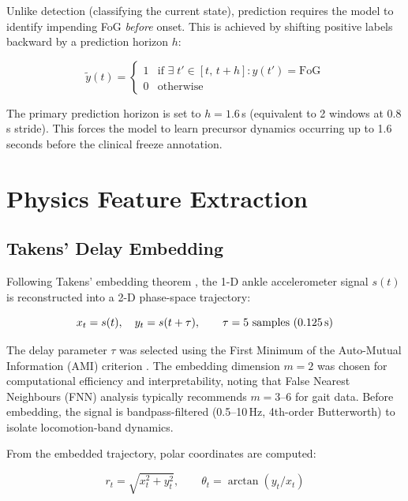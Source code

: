 \documentclass[12pt,a4paper,oneside]{report}
\numberwithin{equation}{chapter}
\numberwithin{figure}{chapter}
\numberwithin{table}{chapter}
\begin{document}
Unlike detection (classifying the current state), prediction requires the model to identify impending FoG \textit{before} onset. This is achieved by shifting positive labels backward by a prediction horizon $h$:

\begin{equation}
  \tilde{y}(t) =
  \begin{cases}
    1 & \text{if } \exists\; t' \in [t,\, t+h]: y(t')=\text{FoG} \\
    0 & \text{otherwise}
  \end{cases}
  \label{eq:shifted_label}
\end{equation}

The primary prediction horizon is set to $h = 1.6$\,s (equivalent to 2 windows at 0.8\,s stride). This forces the model to learn precursor dynamics occurring up to 1.6 seconds before the clinical freeze annotation.

\section{Physics Feature Extraction}

\subsection{Takens' Delay Embedding}

Following Takens' embedding theorem \cite{takens1981}, the 1-D ankle accelerometer signal $s(t)$ is reconstructed into a 2-D phase-space trajectory:

\begin{equation}
  x_t = s(t), \quad y_t = s(t + \tau), \qquad \tau = 5 \text{ samples (0.125\,s)}
  \label{eq:delay_embed}
\end{equation}

The delay parameter $\tau$ was selected using the First Minimum of the Auto-Mutual Information (AMI) criterion \cite{fraser1986}. The embedding dimension $m = 2$ was chosen for computational efficiency and interpretability, noting that False Nearest Neighbours (FNN) analysis \cite{kennel1992} typically recommends $m = 3$--$6$ for gait data. Before embedding, the signal is bandpass-filtered (0.5--10\,Hz, 4th-order Butterworth) to isolate locomotion-band dynamics.

From the embedded trajectory, polar coordinates are computed:

\begin{equation}
  r_t = \sqrt{x_t^2 + y_t^2}, \qquad \theta_t = \arctan(y_t / x_t)
  \label{eq:polar}
\end{equation}
\end{document}
